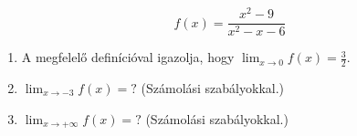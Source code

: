 \documentclass[11pt]{scrartcl}
\begin{document}
\[
	f(x) = \frac{x^2 - 9}{x^2 - x - 6}
\]
\begin{enumerate}
	\item A megfelelő definícióval igazolja, hogy
	      \(\displaystyle \lim_{x \to 0} f(x) = \frac{3}{2}\).

	\item \(\displaystyle \lim_{x \to -3} f(x) = ?\) (Számolási szabályokkal.)

	\item \(\displaystyle \lim_{x \to +\infty} f(x) = ?\) (Számolási
	      szabályokkal.)
\end{enumerate}
\end{document}
